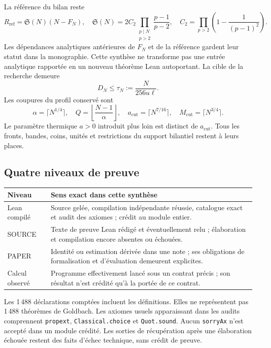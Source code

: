 \documentclass[11pt,a4paper]{article}
\theoremstyle{remark}
\newcommand{\Sing}{\mathfrak S}
\begin{document}
La référence du bilan reste
\begin{equation}\label{eq:reference}
R_{\mathrm{ref}}=\Sing(N)(N-F_N),\quad
\Sing(N)=2C_2\prod_{\substack{p\mid N\\p>2}}\frac{p-1}{p-2},\quad
C_2=\prod_{p>2}\left(1-\frac1{(p-1)^2}\right).
\end{equation}
Les dépendances analytiques antérieures de $F_N$ et de la référence gardent
leur statut dans la monographie. Cette synthèse ne transforme pas une entrée
analytique rapportée en un nouveau théorème Lean autoportant. La cible de la
recherche demeure
\begin{equation}\label{eq:target}
D_N\le \tau_N:=\frac{N}{256u\ell}.
\end{equation}
Les coupures du profil conservé sont
\[
\alpha=\lceil N^{1/4}\rceil,\quad Q=\left\lfloor\frac{N-1}{\alpha}\right\rfloor,
\quad a_{\mathrm{cut}}=\lceil N^{7/16}\rceil,
\quad M_{\mathrm{cut}}=\lceil N^{3/4}\rceil.
\]
Le paramètre thermique $a>0$ introduit plus loin est distinct de
$a_{\mathrm{cut}}$. Tous les fronts, bandes, coins, unités et restrictions
du support bilantiel restent à leurs places.

\subsection*{Quatre niveaux de preuve}
\begin{tabularx}{\textwidth}{@{}p{29mm}Y@{}}
\toprule
Niveau & Sens exact dans cette synthèse\\
\midrule
Lean compilé & Source gelée, compilation indépendante réussie, catalogue
exact et audit des axiomes ; crédit au module entier.\\
SOURCE & Texte de preuve Lean rédigé et éventuellement relu ; élaboration
et compilation encore absentes ou échouées.\\
PAPER & Identité ou estimation dérivée dans une note ; ses obligations de
formalisation et d'évaluation demeurent explicites.\\
Calcul observé & Programme effectivement lancé sous un contrat précis ;
son résultat n'est crédité qu'à la portée de ce contrat.\\
\bottomrule
\end{tabularx}
Les 1\,488 déclarations comptées incluent les définitions. Elles ne représentent
pas 1\,488 théorèmes de Goldbach. Les axiomes usuels apparaissant dans les
audits comprennent \texttt{propext}, \texttt{Classical.choice} et
\texttt{Quot.sound}. Aucun \texttt{sorryAx} n'est accepté dans un module crédité.
Les sorties de récupération après une élaboration échouée restent des faits
d'échec technique, sans crédit de preuve.
\end{document}
